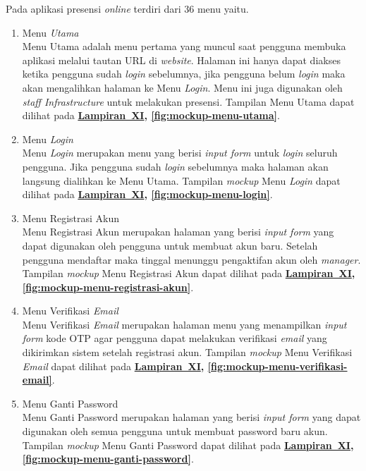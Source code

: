 Pada aplikasi presensi \textit{online} terdiri dari 36 menu yaitu.
\begin{enumerate}
    \item Menu \textit{Utama}
    \\ Menu Utama adalah menu pertama yang muncul saat pengguna membuka aplikasi melalui tautan URL di \textit{website}. Halaman ini hanya dapat diakses ketika pengguna sudah \textit{login} sebelumnya, jika pengguna belum \textit{login} maka akan mengalihkan halaman ke Menu \textit{Login}. Menu ini juga digunakan oleh \textit{staff Infrastructure} untuk melakukan presensi. Tampilan Menu Utama dapat dilihat pada \textbf{\hyperref[sec:mockup-aplikasi-presensi-online]{Lampiran~XI}, \ref{fig:mockup-menu-utama}}.
    
    \item Menu \textit{Login}
    \\ Menu \textit{Login} merupakan menu yang berisi \textit{input form} untuk \textit{login} seluruh pengguna. Jika pengguna sudah \textit{login} sebelumnya maka halaman akan langsung dialihkan ke Menu Utama. Tampilan \textit{mockup} Menu \textit{Login} dapat dilihat pada \textbf{\hyperref[sec:mockup-aplikasi-presensi-online]{Lampiran~XI}, \ref{fig:mockup-menu-login}}.

    \item Menu Registrasi Akun
    \\ Menu Registrasi Akun merupakan halaman yang berisi \textit{input form} yang dapat digunakan oleh pengguna untuk membuat akun baru. Setelah pengguna mendaftar maka tinggal menunggu pengaktifan akun oleh \textit{manager}. Tampilan \textit{mockup} Menu Registrasi Akun dapat dilihat pada \textbf{\hyperref[sec:mockup-aplikasi-presensi-online]{Lampiran~XI}, \ref{fig:mockup-menu-registrasi-akun}}.

    \item Menu Verifikasi \textit{Email}
    \\ Menu Verifikasi \textit{Email} merupakan halaman menu yang menampilkan \textit{input form} kode OTP agar pengguna dapat melakukan verifikasi \textit{email} yang dikirimkan sistem setelah registrasi akun. Tampilan \textit{mockup} Menu Verifikasi \textit{Email} dapat dilihat pada \textbf{\hyperref[sec:mockup-aplikasi-presensi-online]{Lampiran~XI}, \ref{fig:mockup-menu-verifikasi-email}}.

    \item Menu Ganti Password
    \\ Menu Ganti Password merupakan halaman yang berisi \textit{input form} yang dapat digunakan oleh semua pengguna untuk membuat password baru akun. Tampilan \textit{mockup} Menu Ganti Password dapat dilihat pada \textbf{\hyperref[sec:mockup-aplikasi-presensi-online]{Lampiran~XI}, \ref{fig:mockup-menu-ganti-password}}.


\end{enumerate}
